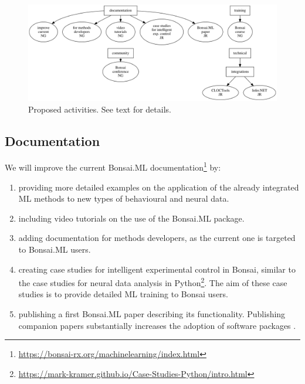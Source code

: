 
\begin{figure}
    \centering
    \includegraphics[width=6in]{activitiesGraphs/activities_larger.png}
    \caption{Proposed activities. See text for details.}
\end{figure}

\subsection*{Documentation}

We will improve the current Bonsai.ML
documentation\footnote[3]{\url{https://bonsai-rx.org/machinelearning/index.html}}
by:

\begin{enumerate}

    \item providing more detailed examples on the application of the
        already integrated ML methods to new types of behavioural and
        neural data.

    \item including video tutorials on the use of the Bonsai.ML
        package.

    \item adding documentation for methods developers, as the current one is
        targeted to Bonsai.ML users.

    \item creating case studies for intelligent experimental control in Bonsai,
        similar to the case studies for neural data analysis in
        Python\footnote[4]{\url{https://mark-kramer.github.io/Case-Studies-Python/intro.html}}.
        The aim of these case studies is to provide detailed ML training to
        Bonsai users.

    \item publishing a first Bonsai.ML paper describing its functionality.
        Publishing companion papers substantially increases the adoption of
        software packages \citep{lopesEtAl15,guilbeaultEtAl21}.

\end{enumerate}

